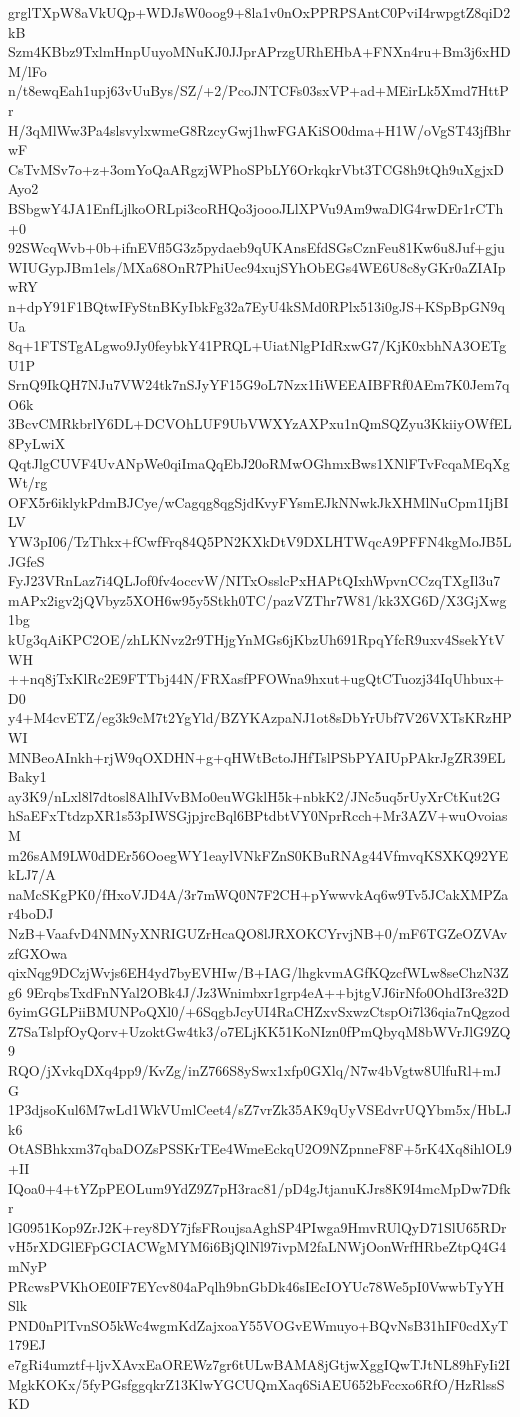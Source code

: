 grglTXpW8aVkUQp+WDJsW0oog9+8la1v0nOxPPRPSAntC0PviI4rwpgtZ8qiD2kB
Szm4KBbz9TxlmHnpUuyoMNuKJ0JJprAPrzgURhEHbA+FNXn4ru+Bm3j6xHDM/lFo
n/t8ewqEah1upj63vUuBys/SZ/+2/PcoJNTCFs03sxVP+ad+MEirLk5Xmd7HttPr
H/3qMlWw3Pa4slsvylxwmeG8RzcyGwj1hwFGAKiSO0dma+H1W/oVgST43jfBhrwF
CsTvMSv7o+z+3omYoQaARgzjWPhoSPbLY6OrkqkrVbt3TCG8h9tQh9uXgjxDAyo2
BSbgwY4JA1EnfLjlkoORLpi3coRHQo3joooJLlXPVu9Am9waDlG4rwDEr1rCTh+0
92SWcqWvb+0b+ifnEVfl5G3z5pydaeb9qUKAnsEfdSGsCznFeu81Kw6u8Juf+gju
WIUGypJBm1els/MXa68OnR7PhiUec94xujSYhObEGs4WE6U8c8yGKr0aZIAIpwRY
n+dpY91F1BQtwIFyStnBKyIbkFg32a7EyU4kSMd0RPlx513i0gJS+KSpBpGN9qUa
8q+1FTSTgALgwo9Jy0feybkY41PRQL+UiatNlgPIdRxwG7/KjK0xbhNA3OETgU1P
SrnQ9IkQH7NJu7VW24tk7nSJyYF15G9oL7Nzx1IiWEEAIBFRf0AEm7K0Jem7qO6k
3BcvCMRkbrlY6DL+DCVOhLUF9UbVWXYzAXPxu1nQmSQZyu3KkiiyOWfEL8PyLwiX
QqtJlgCUVF4UvANpWe0qiImaQqEbJ20oRMwOGhmxBws1XNlFTvFcqaMEqXgWt/rg
OFX5r6iklykPdmBJCye/wCagqg8qgSjdKvyFYsmEJkNNwkJkXHMlNuCpm1IjBILV
YW3pI06/TzThkx+fCwfFrq84Q5PN2KXkDtV9DXLHTWqcA9PFFN4kgMoJB5LJGfeS
FyJ23VRnLaz7i4QLJof0fv4occvW/NITxOsslcPxHAPtQIxhWpvnCCzqTXgIl3u7
mAPx2igv2jQVbyz5XOH6w95y5Stkh0TC/pazVZThr7W81/kk3XG6D/X3GjXwg1bg
kUg3qAiKPC2OE/zhLKNvz2r9THjgYnMGs6jKbzUh691RpqYfcR9uxv4SsekYtVWH
++nq8jTxKlRc2E9FTTbj44N/FRXasfPFOWna9hxut+ugQtCTuozj34IqUhbux+D0
y4+M4cvETZ/eg3k9cM7t2YgYld/BZYKAzpaNJ1ot8sDbYrUbf7V26VXTsKRzHPWI
MNBeoAInkh+rjW9qOXDHN+g+qHWtBctoJHfTslPSbPYAIUpPAkrJgZR39ELBaky1
ay3K9/nLxl8l7dtosl8AlhIVvBMo0euWGklH5k+nbkK2/JNc5uq5rUyXrCtKut2G
hSaEFxTtdzpXR1s53pIWSGjpjrcBql6BPtdbtVY0NprRcch+Mr3AZV+wuOvoiasM
m26sAM9LW0dDEr56OoegWY1eaylVNkFZnS0KBuRNAg44VfmvqKSXKQ92YEkLJ7/A
naMcSKgPK0/fHxoVJD4A/3r7mWQ0N7F2CH+pYwwvkAq6w9Tv5JCakXMPZar4boDJ
NzB+VaafvD4NMNyXNRIGUZrHcaQO8lJRXOKCYrvjNB+0/mF6TGZeOZVAvzfGXOwa
qixNqg9DCzjWvjs6EH4yd7byEVHIw/B+IAG/lhgkvmAGfKQzcfWLw8seChzN3Zg6
9ErqbsTxdFnNYal2OBk4J/Jz3Wnimbxr1grp4eA++bjtgVJ6irNfo0OhdI3re32D
6yimGGLPiiBMUNPoQXl0/+6SqgbJcyUI4RaCHZxvSxwzCtspOi7l36qia7nQgzod
Z7SaTslpfOyQorv+UzoktGw4tk3/o7ELjKK51KoNIzn0fPmQbyqM8bWVrJlG9ZQ9
RQO/jXvkqDXq4pp9/KvZg/inZ766S8ySwx1xfp0GXlq/N7w4bVgtw8UlfuRl+mJG
1P3djsoKul6M7wLd1WkVUmlCeet4/sZ7vrZk35AK9qUyVSEdvrUQYbm5x/HbLJk6
OtASBhkxm37qbaDOZsPSSKrTEe4WmeEckqU2O9NZpnneF8F+5rK4Xq8ihlOL9+II
IQoa0+4+tYZpPEOLum9YdZ9Z7pH3rac81/pD4gJtjanuKJrs8K9I4mcMpDw7Dfkr
lG0951Kop9ZrJ2K+rey8DY7jfsFRoujsaAghSP4PIwga9HmvRUlQyD71SlU65RDr
vH5rXDGlEFpGCIACWgMYM6i6BjQlNl97ivpM2faLNWjOonWrfHRbeZtpQ4G4mNyP
PRcwsPVKhOE0IF7EYcv804aPqlh9bnGbDk46sIEcIOYUc78We5pI0VwwbTyYHSlk
PND0nPlTvnSO5kWc4wgmKdZajxoaY55VOGvEWmuyo+BQvNsB31hIF0cdXyT179EJ
e7gRi4umztf+ljvXAvxEaOREWz7gr6tULwBAMA8jGtjwXggIQwTJtNL89hFyIi2I
MgkKOKx/5fyPGsfggqkrZ13KlwYGCUQmXaq6SiAEU652bFccxo6RfO/HzRlssSKD
